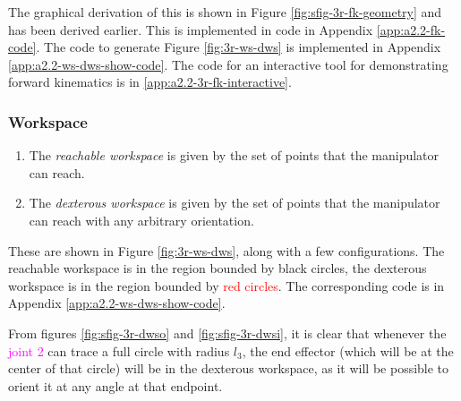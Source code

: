 The graphical derivation of this is shown in Figure \ref{fig:sfig-3r-fk-geometry} and has been derived earlier. This is implemented in code in Appendix \ref{app:a2.2-fk-code}. The code to generate Figure \ref{fig:3r-ws-dws} is implemented in Appendix \ref{app:a2.2-ws-dws-show-code}. The code for an interactive tool for demonstrating forward kinematics is in \ref{app:a2.2-3r-fk-interactive}.

\subsubsection*{Workspace}

\begin{enumerate}
    \item The \emph{reachable workspace} is given by the set of points that the manipulator can reach.
    \item The \emph{dexterous workspace} is given by the set of points that the manipulator can reach with any arbitrary orientation.
\end{enumerate}

These are shown in Figure \ref{fig:3r-ws-dws}, along with a few configurations. The reachable workspace is in the region bounded by black circles, the dexterous workspace is in the region bounded by \textcolor{red}{red circles}. The corresponding code is in Appendix \ref{app:a2.2-ws-dws-show-code}.

From figures \ref{fig:sfig-3r-dwso} and \ref{fig:sfig-3r-dwsi}, it is clear that whenever the \textcolor{magenta}{joint 2} can trace a full circle with radius $l_3$, the end effector (which will be at the center of that circle) will be in the dexterous workspace, as it will be possible to orient it at any angle at that endpoint.

